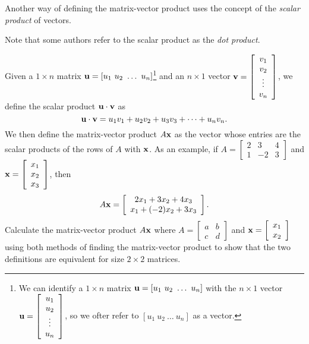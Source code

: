 \item \label{ex:1_e_scalar_product} Another way of defining the matrix-vector product uses the concept of the \emph{scalar product} of vectors.\begin{footnote}{Note that some authors refer to the scalar product as the \emph{dot product}.}\end{footnote} Given a $1 \times n$ matrix $\vu = [u_1 \ u_2 \ \ldots \ u_n]$\footnote{We can identify a $1 \times n$ matrix $\vu = [u_1 \ u_2 \ \ldots \ u_n]$ with the $n \times 1$ vector $\mathbf{u}=\left[ \begin{array}{c} u_1\\ u_2\\ \vdots \\ u_n \end{array} \right]$, so we ofter refer to $ [u_1 \ u_2 \ \ldots \ u_n]$ as a vector.} and an $n \times 1$ vector $\mathbf{v}=\left[ \begin{array}{c} v_1\\ v_2\\ \vdots \\ v_n \end{array} \right]$, we define the scalar product $\mathbf{u} \cdot \mathbf{v}$ as 
\[\mathbf{u} \cdot \mathbf{v} = u_1v_1 + u_2v_2 + u_3v_3 + \cdots + u_nv_n.\]
We then define the matrix-vector product $A\mathbf{x}$ as the vector whose entries are the scalar products of the rows of $A$ with $\mathbf{x}$. As an example, if $A= \left[ \begin{array}{crc} 2 & 3 & 4 \\ 1 & -2 & 3 \end{array} \right]$ and $\mathbf{x} = \left[ \begin{array}{c} x_1 \\ x_2 \\ x_3 \end{array} \right]$, then 
\[A \mathbf{x} = \left[ \begin{array}{c} 2x_1+3x_2 +4x_3 \\ x_1 +(-2)x_2 + 3x_3 \end{array} \right].\]
Calculate the matrix-vector product $A\mathbf{x}$ where $A=\left[ \begin{array}{cc} a & b\\ c& d \end{array} \right]$ and $\mathbf{x}=\left[ \begin{array}{c} x_1 \\ x_2 \end{array} \right]$ using both methods of finding the matrix-vector product to show that the two definitions are equivalent for size $2\times 2$ matrices.


